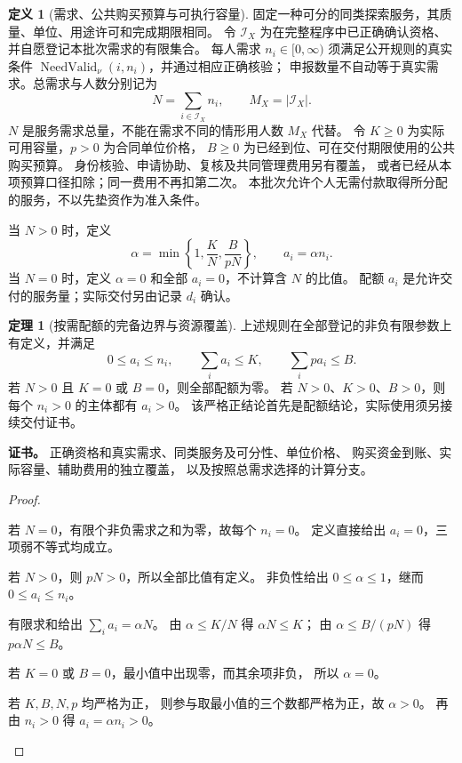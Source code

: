 \documentclass[UTF8,12pt,a4paper,openany,fontset=none,zihao=false]{ctexrep}
\theoremstyle{definition}
\newtheorem{definition}{定义}[chapter]
\newtheorem{theorem}{定理}[chapter]
\newenvironment{certificate}{\par\noindent\textbf{证书。}\ignorespaces}{\par}
\newcommand{\1}{\mathbf 1}
\begin{document}
\begin{definition}[需求、公共购买预算与可执行容量]
\label{access:divisible}
固定一种可分的同类探索服务，其质量、单位、用途许可和完成期限相同。
令 \(\mathcal I_X\) 为在完整程序中已正确确认资格、并自愿登记本批次需求的有限集合。
每人需求 \(n_i\in[0,\infty)\) 须满足公开规则的真实条件
\(\operatorname{NeedValid}_\nu(i,n_i)\)，并通过相应正确核验；
申报数量不自动等于真实需求。总需求与人数分别记为
\[
N=\sum_{i\in\mathcal I_X}n_i,\qquad M_X=|\mathcal I_X|.
\]
\(N\) 是服务需求总量，不能在需求不同的情形用人数 \(M_X\) 代替。
令 \(K\ge0\) 为实际可用容量，\(p>0\) 为合同单位价格，
\(B\ge0\) 为已经到位、可在交付期限使用的公共购买预算。
身份核验、申请协助、复核及共同管理费用另有覆盖，
或者已经从本项预算口径扣除；同一费用不再扣第二次。
本批次允许个人无需付款取得所分配的服务，不以先垫资作为准入条件。

当 \(N>0\) 时，定义
\[
\alpha=\min\left\{1,\frac K N,\frac B{pN}\right\},
\qquad a_i=\alpha n_i.
\]
当 \(N=0\) 时，定义 \(\alpha=0\) 和全部 \(a_i=0\)，不计算含 \(N\) 的比值。
配额 \(a_i\) 是允许交付的服务量；实际交付另由记录 \(d_i\) 确认。
\end{definition}

\begin{theorem}[按需配额的完备边界与资源覆盖]
\label{access:proportional}
上述规则在全部登记的非负有限参数上有定义，并满足
\[
0\le a_i\le n_i,\qquad
\sum_i a_i\le K,\qquad
\sum_i pa_i\le B.
\]
若 \(N>0\) 且 \(K=0\) 或 \(B=0\)，则全部配额为零。
若 \(N>0\)、\(K>0\)、\(B>0\)，则每个 \(n_i>0\) 的主体都有 \(a_i>0\)。
该严格正结论首先是配额结论，实际使用须另接续交付证书。
\end{theorem}
\begin{certificate}
正确资格和真实需求、同类服务及可分性、单位价格、
购买资金到账、实际容量、辅助费用的独立覆盖，
以及按照总需求选择的计算分支。
\end{certificate}
\begin{proof}
\begin{semanticsteps}
\item 若 \(N=0\)，有限个非负需求之和为零，故每个 \(n_i=0\)。
定义直接给出 \(a_i=0\)，三项弱不等式均成立。
\item 若 \(N>0\)，则 \(pN>0\)，所以全部比值有定义。
非负性给出 \(0\le\alpha\le1\)，继而 \(0\le a_i\le n_i\)。
\item 有限求和给出 \(\sum_i a_i=\alpha N\)。
由 \(\alpha\le K/N\) 得 \(\alpha N\le K\)；
由 \(\alpha\le B/(pN)\) 得 \(p\alpha N\le B\)。
\item 若 \(K=0\) 或 \(B=0\)，最小值中出现零，而其余项非负，
所以 \(\alpha=0\)。
\item 若 \(K,B,N,p\) 均严格为正，
则参与取最小值的三个数都严格为正，故 \(\alpha>0\)。
再由 \(n_i>0\) 得 \(a_i=\alpha n_i>0\)。
\end{semanticsteps}
\end{proof}
\end{document}
